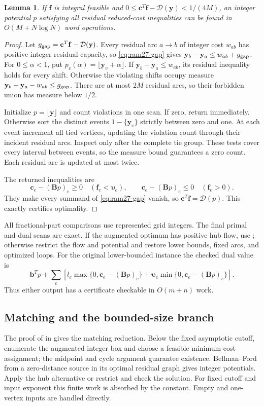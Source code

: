 \documentclass[11pt]{article}
\newtheorem{lemma}[theorem]{Lemma}
\theoremstyle{remark}
\newcommand{\BB}{\mathbf B}
\newcommand{\bb}{\mathbf b}
\newcommand{\cc}{\mathbf c}
\newcommand{\ff}{\mathbf f}
\newcommand{\yy}{\mathbf y}
\newcommand{\vvu}{\boldsymbol{\upsilon}}
\begin{document}
\begin{lemma}
\label{lem:ram27-dual}
If $\ff$ is integral feasible and $0\le \cc^T\ff-\mathcal D(\yy)<1/(4M)$, an integer potential
$p$ satisfying all residual reduced-cost inequalities can be found in $O(M+N\log
N)$ word operations.
\end{lemma} \begin{proof} Let $g_{\rm gap}=\cc^T\ff-\mathcal D(\yy)$.
Every residual arc $a\to b$ of integer cost $w_{ab}$ has positive integer residual
capacity, so \eqref{eq:ram27-gap} gives $\yy_b-\yy_a\le w_{ab}+g_{\rm gap}$.
For $0\le\alpha<1$, put $p_v(\alpha)=\lfloor \yy_v+\alpha\rfloor$.
If $\yy_b-\yy_a\le w_{ab}$, its residual inequality holds for every shift.
Otherwise the violating shifts occupy measure $\yy_b-\yy_a-w_{ab}\le g_{\rm gap}$.
There are at most $2M$ residual arcs, so their forbidden union has measure below
$1/2$.

Initialize $p=\lfloor \yy\rfloor$ and count violations in one scan.
If zero, return immediately.
Otherwise sort the distinct events $1-\{\yy_v\}$ strictly between zero and one.
At each event increment all tied vertices, updating the violation count through
their incident residual arcs.
Inspect only after the complete tie group.
These tests cover every interval between events, so the measure bound guarantees
a zero count.
Each residual arc is updated at most twice.

The returned inequalities are
\[
 \cc_e-(\BB p)_e\ge0\quad(\ff_e<\vvu_e),\qquad
 \cc_e-(\BB p)_e\le0\quad(\ff_e>0).
\]
They make every summand of \eqref{eq:ram27-gap} vanish, so $\cc^T\ff=\mathcal D(p)$.
This exactly certifies optimality.
\end{proof}

All fractional-part comparisons use represented grid integers.
The final primal and dual scans are exact.
If the augmented optimum has positive hub flow, use ;
otherwise restrict the flow and potential and restore lower bounds, fixed arcs,
and optimized loops.
For the original lower-bounded instance the checked dual value is
\[
 \bb^Tp+\sum_e\left[
       l_e\max\{0,\cc_e-(\BB p)_e\}
          +\vvu_e\min\{0,\cc_e-(\BB p)_e\}\right].
\]
Thus either output has a certificate checkable in $O(m+n)$ work.

\subsection{Matching and the bounded-size branch}

The proof of  in  gives
the matching reduction.
Below the fixed asymptotic cutoff, enumerate the augmented integer box and
choose a feasible minimum-cost assignment; the midpoint and cycle argument
guarantee existence.
Bellman--Ford from a zero-distance source in its optimal residual graph gives
integer potentials.
Apply the hub alternative or restrict and check the solution.
For fixed cutoff and input exponent this finite work is absorbed by the
constant.
Empty and one-vertex inputs are handled directly.
\end{document}
